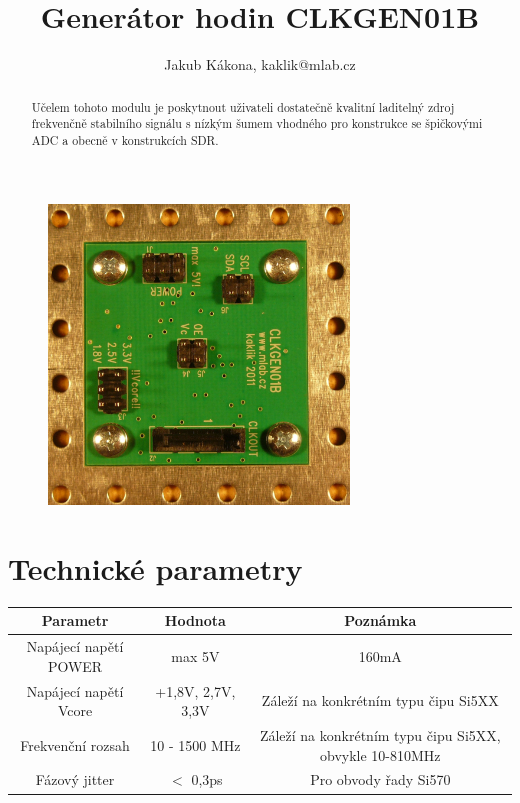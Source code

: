 \documentclass[12pt,a4paper,twoside]{article}
\begin{document}
\title{Generátor hodin CLKGEN01B}
\author{Jakub Kákona, kaklik@mlab.cz}
\maketitle

\thispagestyle{empty}
\begin{abstract}
Učelem tohoto modulu je poskytnout uživateli dostatečně kvalitní laditelný zdroj frekvenčně stabilního signálu s nízkým šumem vhodného pro konstrukce se špičkovými ADC a obecně v konstrukcích SDR.
\end{abstract}

\begin{figure} [htbp]
\begin{center}
\includegraphics [width=80mm] {CLKGEN01B_Top_Big.jpg} 
\end{center}
\end{figure}

\tableofcontents

\section{Technické parametry}
\begin{table}[htbp]
\begin{center}
\begin{tabular}{|c|c|c|}
\hline
\multicolumn{1}{|c|}{Parametr} & \multicolumn{1}{|c|}{Hodnota} & \multicolumn{1}{|c|}{Poznámka} \\ \hline
Napájecí napětí POWER  & max 5V &  160mA \\ \hline
Napájecí napětí Vcore & +1,8V, 2,7V, 3,3V &  Záleží na konkrétním typu čipu Si5XX \\ \hline
Frekvenční rozsah  & 10 - 1500 MHz & Záleží na konkrétním typu čipu Si5XX, obvykle 10-810MHz \\ \hline
Fázový jitter  & $<$ 0,3ps & Pro obvody řady Si570 \\ \hline
\end{tabular}
\end{center}
\end{table}
\end{document}
